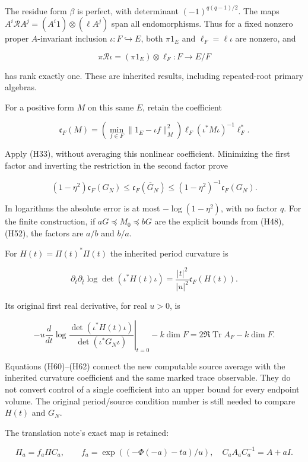 \documentclass[
]{article}
\begin{document}
The residue form \(\beta\) is perfect, with determinant
\((-1)^{q(q-1)/2}\). The maps
\(A^i\mathcal RA^j=(A^i1)\otimes(\ell A^j)\) span all endomorphisms.
Thus for a fixed nonzero proper \(A\)-invariant inclusion
\(\iota:F\hookrightarrow E\), both \(\pi1_E\) and \(\ell_F=\ell\iota\)
are nonzero, and

\[
 \pi\mathcal R\iota=(\pi1_E)\otimes\ell_F:F\to E/F
 \tag{H58}
\]

has rank exactly one. These are inherited results, including
repeated-root primary algebras.

For a positive form \(M\) on this same \(E\), retain the coefficient

\[
 \mathfrak c_F(M)=
 \left(\min_{f\in F}\|1_E-\iota f\|_M^2\right)
 \ell_F(\iota^*M\iota)^{-1}\ell_F^*.
 \tag{H59}
\]

Apply (H33), without averaging this nonlinear coefficient. Minimizing
the first factor and inverting the restriction in the second factor
prove

\[
 \boxed{
 (1-\eta^2)\mathfrak c_F(G_N)
 \leq\mathfrak c_F(\overline G_N)
 \leq(1-\eta^2)^{-1}\mathfrak c_F(G_N).}
 \tag{H60}
\]

In logarithms the absolute error is at most \(-\log(1-\eta^2)\), with no
factor \(q\). For the finite construction, if
\(aG\preceq M_0\preceq bG\) are the explicit bounds from (H48), (H52),
the factors are \(a/b\) and \(b/a\).

For \(H(t)=\Pi(t)^*\Pi(t)\) the inherited period curvature is

\[
 \partial_t\partial_{\bar t}\log\det(\iota^*H(t)\iota)
 =\frac{|t|^2}{|u|^2}\mathfrak c_F(H(t)).
 \tag{H61}
\]

Its original first real derivative, for real \(u>0\), is

\[
 -u\left.\frac d{dt}\log
 \frac{\det(\iota^*H(t)\iota)}{\det(\iota^*G_N\iota)}
 \right|_{t=0}-k\dim F
 =2\Re\operatorname{Tr}A_F-k\dim F.
 \tag{H62}
\]

Equations (H60)--(H62) connect the new computable source average with
the inherited curvature coefficient and the same marked trace
observable. They do not convert control of a single coefficient into an
upper bound for every endpoint volume. The original period/source
condition number is still needed to compare \(H(t)\) and \(G_N\).

The translation note's exact map is retained:

\[
 \Pi_a=f_a\Pi C_a,\qquad
 f_a=\exp((-\Phi(-a)-ta)/u),\quad
 C_aA_aC_a^{-1}=A+aI.
 \tag{H63}
\]
\end{document}
